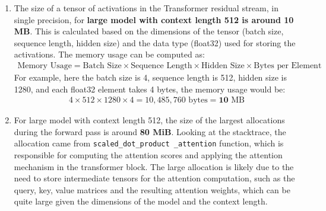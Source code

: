 \documentclass{article}
\begin{document}
\begin{enumerate}[start=1,label=\arabic*.]
\begin{enumerate}
\begin{enumerate}[label=\alph*.]
                    \textbf{The peak memory usage for the forward pass is higher in mixed precision compared to pure float32 precision}. This might be because in mixed precision, some tensors are stored in lower precision (like float16 or bfloat16) which can lead to increased memory fragmentation and overhead from storing additional metadata for managing different data types. However, \textbf{the peak memory usage for the full training step is lower in mixed precision compared to pure float32 precision}. This might be because mixed precision allows for reduced memory bandwidth and faster computation, which can lead to more efficient use of memory during the backward pass and optimization steps, ultimately resulting in lower overall memory usage compared to pure float32 precision.
                \item The size of a tensor of activations in the Transformer residual stream, in single precision, for \textbf{large model with context length 512 is around 10 MB}. This is calculated based on the dimensions of the tensor (batch size, sequence length, hidden size) and the data type (float32) used for storing the activations. The memory usage can be computed as: 
                    \begin{align*}
                        \text{Memory Usage} = \text{Batch Size} \times \text{Sequence Length} \times \text{Hidden Size} \times \text{Bytes per Element}
                    \end{align*}
                    For example, here the batch size is 4, sequence length is 512, hidden size is 1280, and each float32 element takes 4 bytes, the memory usage would be:
                    \begin{align*}
                        4 \times 512 \times 1280 \times 4 = 10,485,760 \text{ bytes} = \mathbf{10} \text{ MB}
                    \end{align*}
                \item For large model with context length 512, the size of the largest allocations during the forward pass is around \textbf{80 MiB}. Looking at the stacktrace, the allocation came from \texttt{scaled\_dot\_product \_attention} function, which is responsible for computing the attention scores and applying the attention mechanism in the transformer block. The large allocation is likely due to the need to store intermediate tensors for the attention computation, such as the query, key, value matrices and the resulting attention weights, which can be quite large given the dimensions of the model and the context length.

\end{enumerate}
\end{enumerate}
\end{enumerate}
\end{document}

